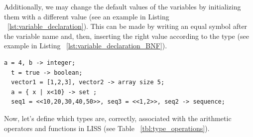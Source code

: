 \documentclass[
  oneside,
  11pt, a4paper,
  footinclude=true,
  headinclude=true,
  cleardoublepage=empty
]{scrbook}
\begin{document}
\newpage
Additionally, we may change the default values of the variables by initializing them with a different value (see an example in Listing ~\ref{lst:variable_declaration}).
This can be made by writing an equal symbol after the variable name and, then, inserting the right value according to the type (see example in Listing ~\ref{lst:variable_declaration_BNF}).

\begin{lstlisting}[caption={Initialize a variable},label={lst:variable_declaration}]
  a = 4, b -> integer;
  t = true -> boolean;
  vector1 = [1,2,3], vector2 -> array size 5;
  a = { x | x<10} -> set ;
  seq1 = <<10,20,30,40,50>>, seq3 = <<1,2>>, seq2 -> sequence;
\end{lstlisting}

Now, let's define which types are, correctly, associated with the arithmetic operators and functions in LISS (see Table ~\ref{tbl:type_operations}).
\end{document}
